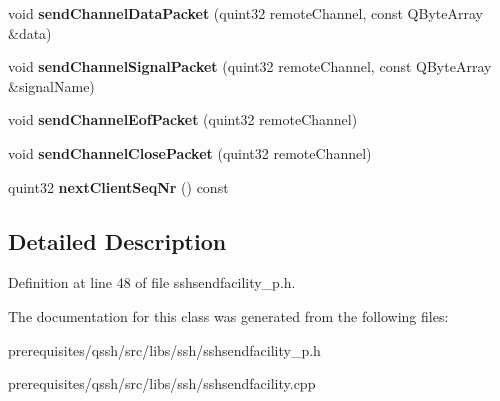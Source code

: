 \begin{DoxyCompactItemize}
\item 
\mbox{\label{class_q_ssh_1_1_internal_1_1_ssh_send_facility_a6e0558c292456b60942dd1e821c14ba8}} 
void {\bfseries send\+Channel\+Data\+Packet} (quint32 remote\+Channel, const Q\+Byte\+Array \&data)
\item 
\mbox{\label{class_q_ssh_1_1_internal_1_1_ssh_send_facility_a28834517a9b8815ed13326eff6110411}} 
void {\bfseries send\+Channel\+Signal\+Packet} (quint32 remote\+Channel, const Q\+Byte\+Array \&signal\+Name)
\item 
\mbox{\label{class_q_ssh_1_1_internal_1_1_ssh_send_facility_ae79cc652a34c3040c55e384f2c2d8395}} 
void {\bfseries send\+Channel\+Eof\+Packet} (quint32 remote\+Channel)
\item 
\mbox{\label{class_q_ssh_1_1_internal_1_1_ssh_send_facility_a3af5d85c2c316b34ed5a4d2c26ee5017}} 
void {\bfseries send\+Channel\+Close\+Packet} (quint32 remote\+Channel)
\item 
\mbox{\label{class_q_ssh_1_1_internal_1_1_ssh_send_facility_ab4af62ccc73927556a357a2d8052f26d}} 
quint32 {\bfseries next\+Client\+Seq\+Nr} () const
\end{DoxyCompactItemize}


\subsection{Detailed Description}


Definition at line 48 of file sshsendfacility\+\_\+p.\+h.



The documentation for this class was generated from the following files\+:\begin{DoxyCompactItemize}
\item 
prerequisites/qssh/src/libs/ssh/sshsendfacility\+\_\+p.\+h\item 
prerequisites/qssh/src/libs/ssh/sshsendfacility.\+cpp\end{DoxyCompactItemize}
